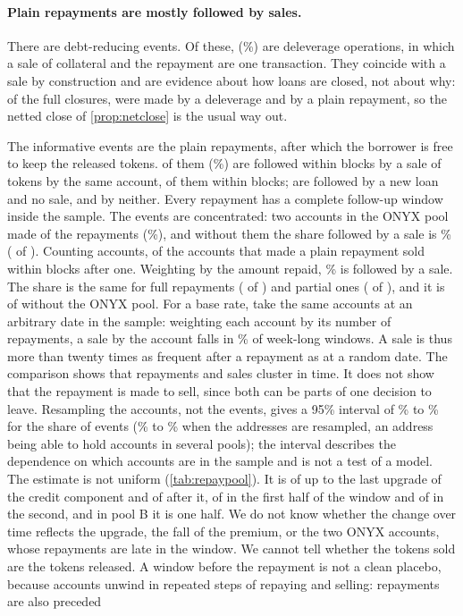 \paragraph{Plain repayments are mostly followed by sales.} There are \EReduce{} debt-reducing events. Of these, \EDeleverage{} (\EDelevPct\%) are deleverage operations, in which a sale of collateral and the repayment are one transaction. They coincide with a sale by construction and are evidence about how loans are closed, not about why: of the full closures, \EFullDelev{} were made by a deleverage and \EFullRepay{} by a plain repayment, so the netted close of \cref{prop:netclose} is the usual way out.

The informative events are the \ERepay{} plain repayments, after which the borrower is free to keep the released tokens. \ECatSold{} of them (\ERepaySoldPct\%) are followed within \EWeekBlocks{} blocks by a sale of tokens by the same account, \ESoldHour{} of them within \EHourBlocks{} blocks; \ECatReborrow{} are followed by a new loan and no sale, and \ECatNeither{} by neither. Every repayment has a complete follow-up window inside the sample. The events are concentrated: two accounts in the ONYX pool made \ETopTwoEvents{} of the repayments (\ETopTwoPct\%), and without them the share followed by a sale is \ERestPct\% (\ERestSold{} of \ERestN). Counting accounts, \EAcctSoldAfter{} of the \ERepayAccts{} accounts that made a plain repayment sold within \EWeekBlocks{} blocks after one. Weighting by the amount repaid, \EAmtSoldPct\% is followed by a sale. The share is the same for full repayments (\EFullRepSold{} of \EFullRepN) and partial ones (\EPartRepSold{} of \EPartRepN), and it is \ENoOnyxSold{} of \ENoOnyxN{} without the ONYX pool. For a base rate, take the same accounts at an arbitrary date in the sample: weighting each account by its number of repayments, a sale by the account falls in \EBaseRate\% of week-long windows. A sale is thus more than twenty times as frequent after a repayment as at a random date. The comparison shows that repayments and sales cluster in time. It does not show that the repayment is made to sell, since both can be parts of one decision to leave. Resampling the \ERepayClusters{} accounts, not the events, gives a 95\% interval of \ERepayCILo\% to \ERepayCIHi\% for the share of events (\EAddrCILo\% to \EAddrCIHi\% when the \EAddrClusters{} addresses are resampled, an address being able to hold accounts in several pools); the interval describes the dependence on which accounts are in the sample and is not a test of a model. The estimate is not uniform (\cref{tab:repaypool}). It is \ERegOneSold{} of \ERegOneN{} up to the last upgrade of the credit component and \ERegTwoSold{} of \ERegTwoN{} after it, \EHalfOneSold{} of \EHalfOneN{} in the first half of the window and \EHalfTwoSold{} of \EHalfTwoN{} in the second, and in pool B it is one half. We do not know whether the change over time reflects the upgrade, the fall of the premium, or the two ONYX accounts, whose repayments are late in the window. We cannot tell whether the tokens sold are the tokens released. A window before the repayment is not a clean placebo, because accounts unwind in repeated steps of repaying and selling: \ESoldBeforeHour{} repayments are also preceded 